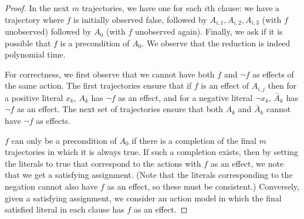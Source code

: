 \documentclass{article}
\theoremstyle{plain}
\theoremstyle{definition}
\theoremstyle{remark}
\theoremstyle{observation}
\begin{document}
{\begin{proof}
In the next $m$ trajectories, we have one for each $i$th clause: we have a trajectory where $f$ is initially observed false, followed by $A_{i,1},A_{i,2},A_{i,3}$ (with $f$ unobserved) followed by $A_0$ (with $f$ unobserved again). Finally, we ask if it is possible that $f$ is a precondition of $A_0$. We observe that the reduction is indeed polynomial time.

For correctness, we first observe that we cannot have both $f$ and $\neg f$ as effects of the same action. 
The first trajectories ensure that if $f$ is an effect of $A_{i,j}$ then for a positive literal $x_k$, $A_k$ has $\neg f$ as an effect, and for a negative literal $\neg x_k$, $\bar{A}_k$ has $\neg f$ as an effect.
The next set of trajectories ensure that both $A_k$ and $\bar{A}_k$ cannot have $\neg f$ as effects.

$f$ can only be a precondition of $A_0$ if there is a completion of the final $m$ trajectories in which it is always true. If such a completion exists, then by setting the literals to true that correspond to the actions with $f$ as an effect, we note that we get a satisfying assignment. (Note that the literals corresponding to the negation cannot also have $f$ as an effect, so these must be consistent.) Conversely, given a satisfying assignment, we consider an action model in which the final satisfied literal in each clause has $f$ as an effect.
\end{proof}
}\fi
\end{document}
